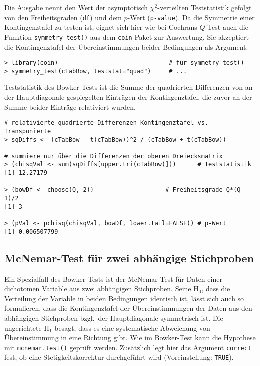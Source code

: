 Die Ausgabe nennt den Wert der asymptotisch $\chi^{2}$-verteilten Teststatistik gefolgt von den Freiheitsgraden (\lstinline!df!) und dem $p$-Wert (\lstinline!p-value!). Da die Symmetrie einer Kontingenztafel zu testen ist, eignet sich hier wie bei Cochrans $Q$-Test auch die Funktion \lstinline!symmetry_test()! aus dem \lstinline!coin! Paket zur Auswertung. Sie akzeptiert die Kontingenztafel der Übereinstimmungen beider Bedingungen als Argument.
\begin{lstlisting}
> library(coin)                               # für symmetry_test()
> symmetry_test(cTabBow, teststat="quad")     # ...
\end{lstlisting}

Teststatistik des Bowker-Tests ist die Summe der quadrierten Differenzen von an der Hauptdiagonale gespiegelten Einträgen der Kontingenztafel, die zuvor an der Summe beider Einträge relativiert wurden.
\begin{lstlisting}
# relativierte quadrierte Differenzen Kontingenztafel vs. Transponierte
> sqDiffs <- (cTabBow - t(cTabBow))^2 / (cTabBow + t(cTabBow))

# summiere nur über die Differenzen der oberen Dreiecksmatrix
> (chisqVal <- sum(sqDiffs[upper.tri(cTabBow)]))      # Teststatistik
[1] 12.27179

> (bowDf <- choose(Q, 2))                    # Freiheitsgrade Q*(Q-1)/2
[1] 3

> (pVal <- pchisq(chisqVal, bowDf, lower.tail=FALSE)) # p-Wert
[1] 0.006507799
\end{lstlisting}

\subsection{McNemar-Test für zwei abhängige Stichproben}
\label{sec:mcNemar}

Ein Spezialfall des Bowker-Tests ist der McNemar-Test für Daten einer dichotomen Variable aus zwei abhängigen Stichproben. Seine $\text{H}_{0}$, dass die Verteilung der Variable in beiden Bedingungen identisch ist, lässt sich auch so formulieren, dass die Kontingenztafel der Übereinstimmungen der Daten aus den abhängigen Stichproben bzgl.\ der Hauptdiagonale symmetrisch ist. Die ungerichtete $\text{H}_{1}$ besagt, dass es eine systematische Abweichung von Übereinstimmung in eine Richtung gibt. Wie im Bowker-Test kann die Hypothese mit  \lstinline!mcnemar.test()! geprüft werden. Zusätzlich legt hier das Argument \lstinline!correct! fest, ob eine Stetigkeitskorrektur durchgeführt wird (Voreinstellung: \lstinline!TRUE!).

